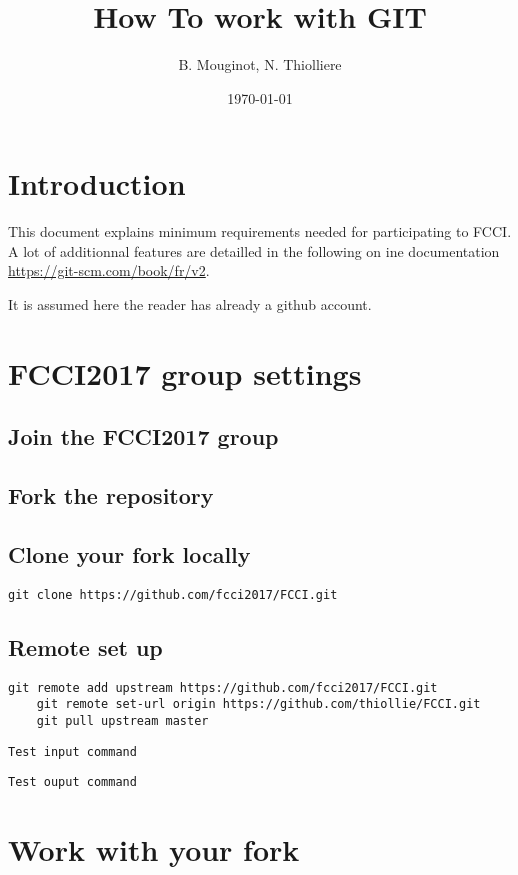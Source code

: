 \documentclass[a4paper,11pt]{article}
\title{How To work with GIT}
\date{\today}
\author{B. Mouginot, N. Thiolliere}
\begin{document}
\maketitle
{}

\tableofcontents

\section{Introduction}

	This document explains minimum requirements needed for participating to FCCI. A lot of additionnal features are detailled in the following on ine documentation \url{https://git-scm.com/book/fr/v2}.

	It is assumed here the reader has already a github account.

\section{FCCI2017 group settings}

	\subsection{Join the FCCI2017 group}

	\subsection{Fork the repository}

	\subsection{Clone your fork locally}

  \begin{lstlisting}[style=BashInputStyle]
    git clone https://github.com/fcci2017/FCCI.git
  \end{lstlisting}
  \bigskip

	\subsection{Remote set up}

  \begin{lstlisting}[style=BashInputStyle]
    git remote add upstream https://github.com/fcci2017/FCCI.git
    git remote set-url origin https://github.com/thiollie/FCCI.git
    git pull upstream master
  \end{lstlisting}
  \bigskip

	\begin{lstlisting}[style=BashInputStyle]
	Test input command
	\end{lstlisting}
	\bigskip

	\begin{lstlisting}[style=BashOutputStyle]
	Test ouput command
	\end{lstlisting}
	\bigskip

\section{Work with your fork}
\end{document}
